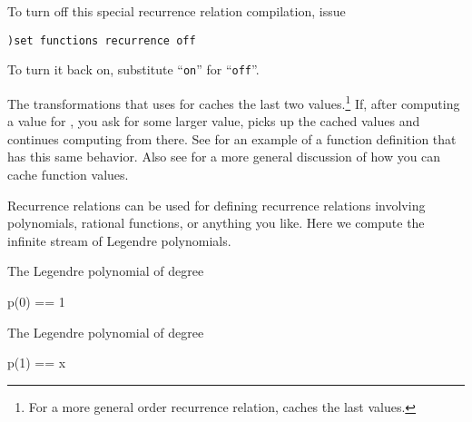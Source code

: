 To turn off this special recurrence relation compilation, issue
\begin{verbatim}
)set functions recurrence off
\end{verbatim}
To turn it back on, substitute ``{\tt on}'' for ``{\tt off}''.

The transformations that \Language{} uses for  caches the
last two values.\footnote{For a more general  order recurrence
relation, \Language{} caches the last  values.}
If, after computing a value for , you ask
for some larger value, \Language{} picks up the cached values
and continues computing from there.
See 
for an example of a function definition that has this same behavior.
Also see 
for a more general discussion of how you can cache function values.

Recurrence relations can be used for defining recurrence relations
involving polynomials, rational functions, or anything you like.
Here we compute the infinite stream of Legendre polynomials.
\begin{xtc}
\begin{xtccomment}
The Legendre polynomial of degree 
\end{xtccomment}
\begin{spadsrc}
p(0) == 1
\end{spadsrc}
\end{xtc}
\begin{xtc}
\begin{xtccomment}
The Legendre polynomial of degree 
\end{xtccomment}
\begin{spadsrc}
p(1) == x
\end{spadsrc}
\end{xtc}

